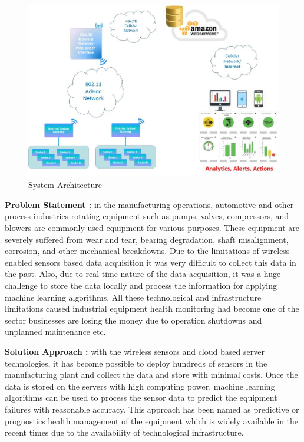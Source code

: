 \documentclass[sigconf]{acmart}
\begin{document}
\begin{figure}
\includegraphics[width=1.0\columnwidth]{images/system_architecture}
\caption{System Architecture} \label{fig:Figure1}
\end{figure}


\textbf{Problem Statement :} in the manufacturing operations, automotive and other process industries rotating equipment such as pumps, valves, compressors, and blowers are commonly used equipment for various purposes. These equipment are severely suffered from wear and tear, bearing degradation, shaft misalignment, corrosion, and other mechanical breakdowns. Due to the limitations of wireless enabled sensors based data acquisition it was very difficult to collect this data in the past. Also, due to real-time nature of the data acquisition, it was a huge challenge to store the data locally and process the information for applying machine learning algorithms. All these technological and infrastructure limitations caused industrial equipment health monitoring had become one of the sector businesses are losing the money due to operation shutdowns and unplanned maintenance etc.

\textbf{Solution Approach :} with the wireless sensors and cloud based server technologies, it has become possible to deploy hundreds of sensors in the manufacturing plant and collect the data and store with minimal costs. Once the data is stored on the servers with high computing power, machine learning algorithms can be used to process the sensor data to predict the equipment failures with reasonable accuracy. This approach has been named as predictive or prognostics health management of the equipment which is widely available in the recent times due to the availability of technological infrastructure.
\end{document}
